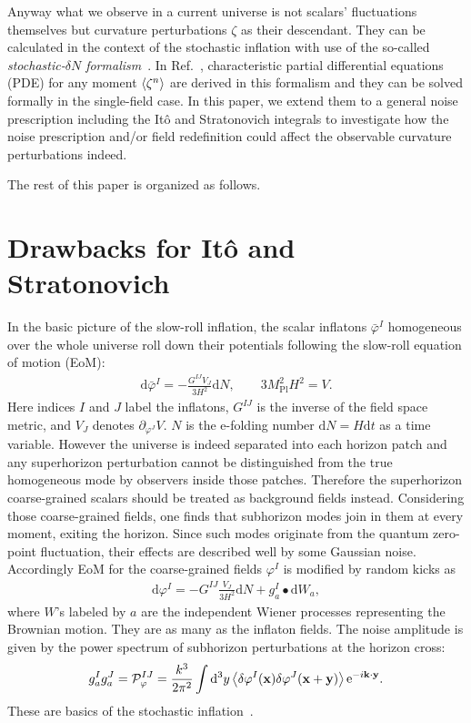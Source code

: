 \documentclass[aps, prd
, preprint
, nofootinbib 
, superscriptaddress
, longbibliography
]{revtex4-1}
\newcommand{\dd}{\mathrm{d}}
\newcommand{\ee}{\mathrm{e}}
\newcommand{\Mpl}{M_\text{Pl}}
\newcommand{\calP}{\mathcal{P}}
\newcommand{\bae}[1]{\begin{align} #1 \end{align}}
\begin{document}
Anyway what we observe in a current universe is not scalars' fluctuations themselves
but curvature perturbations $\zeta$ as their descendant. 
They can be calculated in the context of the
stochastic inflation with use of the so-called \emph{stochastic-$\delta N$ formalism}~\cite{Fujita:2013cna,Fujita:2014tja}.
In Ref.~\cite{Vennin:2015hra}, characteristic partial differential equations (PDE) for any moment $\braket{\zeta^n}$ are derived in this formalism
and they can be solved formally in the single-field case.
In this paper, we extend them to a general noise prescription including the It\^o and
Stratonovich integrals to investigate how the noise prescription and/or field redefinition
could affect the observable curvature perturbations indeed.

The rest of this paper is organized as follows.







\section{Drawbacks for It\^o and Stratonovich}

In the basic picture of the slow-roll inflation, the scalar inflatons $\bar{\varphi}^I$ homogeneous over the whole universe
roll down their potentials following the slow-roll equation of motion (EoM):
\bae{
	\dd \bar{\varphi}^I=-\frac{G^{IJ}V_J}{3H^2}\dd N, \qquad 3\Mpl^2H^2=V.
}
Here indices $I$ and $J$ label the inflatons, $G^{IJ}$ is the inverse of the field space metric, and $V_J$ denotes $\partial_{\varphi^J}V$.
$N$ is the e-folding number $\dd N=H\dd t$ as a time variable.
However the universe is indeed separated into each horizon patch and any superhorizon perturbation cannot be distinguished from the true homogeneous mode
by observers inside those patches. Therefore the superhorizon coarse-grained scalars should be treated as background fields instead.
Considering those coarse-grained fields, one finds that subhorizon modes join in them at every moment, exiting the horizon.
Since such modes originate from the quantum zero-point fluctuation, their effects are described well by some Gaussian noise.
Accordingly EoM for the coarse-grained fields $\varphi^I$ is modified by random kicks as
\bae{\label{eq: SR Langevin}
	\dd\varphi^I=-G^{IJ}\frac{V_J}{3H^2}\dd N + g^I_a\bullet\dd W_a,
}
where $W$'s labeled by $a$ are the independent Wiener processes representing the Brownian motion. They are as many as the inflaton fields.
The noise amplitude is given by the power spectrum of subhorizon perturbations at the horizon cross:
\bae{
	g^I_ag^J_a=\calP_\varphi^{IJ}=\frac{k^3}{2\pi^2}\int\dd^3y\Braket{\delta\varphi^I(\mathbf{x})\delta\varphi^J(\mathbf{x}+\mathbf{y})}
	\ee^{-i\mathbf{k}\cdot\mathbf{y}}.
}
These are basics of the stochastic inflation~\cite{Starobinsky:1986fx,Nambu:1987ef,Nambu:1988je,Kandrup:1988sc,Nakao:1988yi,Nambu:1989uf,
Morikawa:1989xz,Mollerach:1990zf,Linde:1993xx,Starobinsky:1994bd}.
\end{document}
